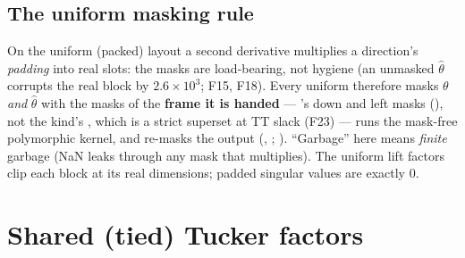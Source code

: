 \documentclass[11pt]{article}
\renewcommand{\th}{\theta}
\newcommand{\thh}{\hat\theta}
\theoremstyle{definition}
\theoremstyle{plain}
\begin{document}
\subsection{The uniform masking rule}
\label{sec:masking}

On the uniform (packed) layout a second derivative multiplies a direction's \emph{padding} into real slots: the
masks are load-bearing, not hygiene (an unmasked $\thh$ corrupts the real block by $2.6\times10^3$; F15, F18). Every
uniform  therefore masks $\th$ \emph{and} $\thh$ with the masks of the \textbf{frame it is
handed} --- 's down and left masks (), not the kind's
, which is a strict superset at TT slack (F23) --- runs the mask-free polymorphic kernel, and
re-masks the output (, ;
). ``Garbage'' here means \emph{finite} garbage (NaN leaks through any mask that
multiplies). The uniform lift factors clip each block at its real dimensions; padded singular values are exactly 0.

\section{Shared (tied) Tucker factors}
\label{sec:shared}
\end{document}
